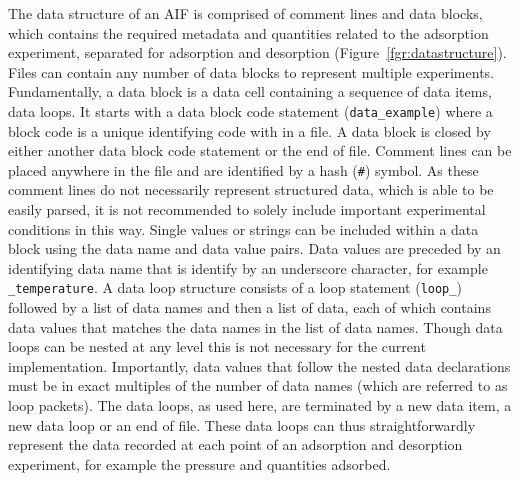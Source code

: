 \documentclass[journal=langd5,manuscript=article]{achemso}
\begin{document}
The data structure of an AIF is comprised of comment lines and data blocks, which contains the required metadata and quantities related to the adsorption experiment, separated for adsorption and desorption (Figure~\ref{fgr:datastructure}).
Files can contain any number of data blocks to represent multiple experiments.
Fundamentally, a data block is a data cell containing a sequence of data items, data loops.
It starts with a data block code statement (\texttt{data\_example}) where a block code is a unique identifying code with in a file.
A data block is closed by either another data block code statement or the end of file.
Comment lines can be placed anywhere in the file and are identified by a hash (\texttt{\#}) symbol.
As these comment lines do not necessarily represent structured data, which is able to be easily parsed, it is not recommended to solely include important experimental conditions in this way.
Single values or strings can be included within a data block using the data name and data value pairs.
Data values are preceded by an identifying data name that is identify by an underscore character, for example \texttt{\_temperature}.
A data loop structure consists of a loop statement (\texttt{loop\_}) followed by a list of data names and then a list of data, each of which contains data values that matches the data names in the list of data names. 
Though data loops can be nested at any level this is not necessary for the current implementation.
Importantly, data values that follow the nested data declarations must be in exact multiples of the number of data names (which are referred to as loop packets).
The data loops, as used here, are terminated by a new data item, a new data loop or an end of file.
These data loops can thus straightforwardly represent the data recorded at each point of an adsorption and desorption experiment, for example the pressure and quantities adsorbed.
\end{document}
